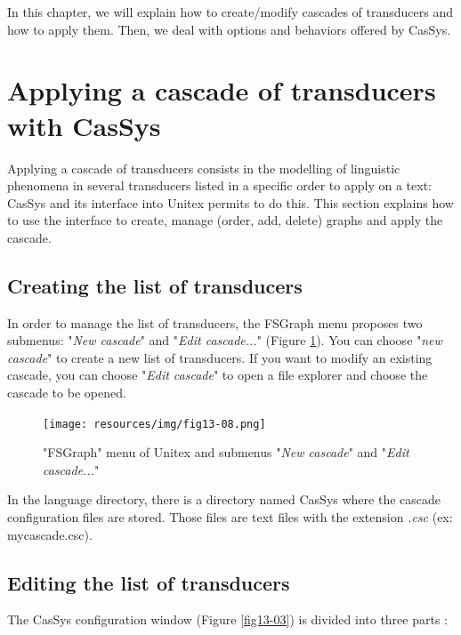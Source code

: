 \bigskip
\noindent  
In this chapter, we will explain how to create/modify cascades of transducers and how to apply them. Then, we deal with options and behaviors offered by CasSys.

\section{Applying a cascade of transducers with CasSys}
\label{section:applyCascade}
Applying a cascade of transducers consists in the modelling of linguistic phenomena in several transducers listed in a specific order to apply on a text: CasSys and its interface into Unitex permits to do this. This section explains how to use the interface to create, manage (order, add, delete) graphs and apply the cascade.   

\subsection{Creating the list of transducers}
\label{subsec:listTrans}

\bigskip
\noindent 
In order to manage the list of transducers, the FSGraph menu proposes two submenus: "\textit{New cascade}" and "\textit{Edit cascade...}" (Figure \ref{fig13-08}). You can choose "\textit{new cascade}" to create a new list of transducers. If you want to modify an existing cascade, you can choose "\textit{Edit cascade}" to open a file explorer and choose the cascade to be opened. 

\begin{figure}[!htb]
 \centering
 \texttt{[image: resources/img/fig13-08.png]}
 \caption{"FSGraph" menu of Unitex and submenus "\textit{New cascade}" and "\textit{Edit cascade...}"}
 \label{fig13-08}
\end{figure}

In the language directory, there is a directory named CasSys where the cascade configuration files are stored. Those files are text files with the extension \textit{.csc} (ex: mycascade.csc).

\subsection{Editing the list of transducers}
\label{subsec:editlistTrans}

The CasSys configuration window (Figure \ref{fig13-03}) is divided into three parts :

